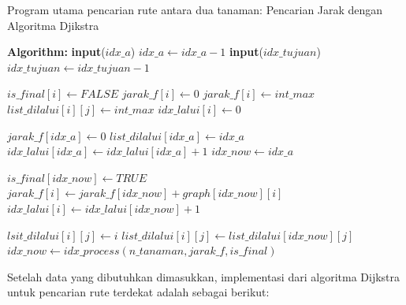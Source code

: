 \documentclass[conference]{IEEEtran}
\begin{document}
\begin{algorithm}[H]
    \caption{Program utama pencarian rute antara dua tanaman: Pencarian Jarak dengan Algoritma Djikstra}\label{alg:jarakMinimum}
\begin{algorithmic}    
    \State \textbf{Algorithm:}
    \State \textbf{input}($idx\_a$)
    \State $idx\_a \leftarrow idx\_a - 1$
    \State \textbf{input}($idx\_tujuan$)
    \State $idx\_tujuan \leftarrow idx\_tujuan - 1$

        \State $is\_final[i] \leftarrow FALSE$
            \State $jarak\_f[i] \leftarrow 0$
        \Else
            \State $jarak\_f[i] \leftarrow int\_max$
        \EndIf
            $list\_dilalui[i][j] \leftarrow int\_max$
        \EndFor
        $idx\_lalui[i] \leftarrow 0$
    \EndFor

    \State $jarak\_f[idx\_a] \leftarrow 0$    
    \State $list\_dilalui[idx\_a] \leftarrow idx\_a$    
    \State $idx\_lalui[idx\_a] \leftarrow idx\_lalui[idx\_a] + 1$
    \State $idx\_now \leftarrow idx\_a$

        \State $is\_final[idx\_now] \leftarrow TRUE$
                \State $jarak\_f[i] \leftarrow jarak\_f[idx\_now] + graph[idx\_now][i]$
                \State $idx\_lalui[i] \leftarrow idx\_lalui[idx\_now] + 1$
            \EndIf

                    \State $lsit\_dilalui[i][j] \leftarrow i$
                \Else
                    \State $list\_dilalui[i][j] \leftarrow list\_dilalui[idx\_now][j]$
                \EndIf
            \EndFor
        \EndFor
        \State $idx\_now \leftarrow idx\_process(n\_tanaman, jarak\_f, is\_final)$
    \EndWhile
\end{algorithmic}
\end{algorithm}

    Setelah data yang dibutuhkan dimasukkan, implementasi
    dari algoritma Dijkstra untuk pencarian rute terdekat adalah
    sebagai berikut:
    
\end{document}
